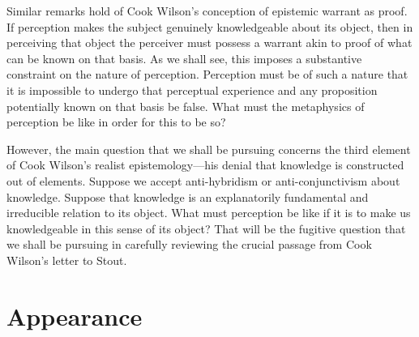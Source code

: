 \documentclass[12pt]{article}
\begin{document}
Similar remarks hold of Cook Wilson's conception of epistemic warrant as proof. If perception makes the subject genuinely knowledgeable about its object, then in perceiving that object the perceiver must possess a warrant akin to proof of what can be known on that basis. As we shall see, this imposes a substantive constraint on the nature of perception. Perception must be of such a nature that it is impossible to undergo that perceptual experience and any proposition potentially known on that basis be false. What must the metaphysics of perception be like in order for this to be so?

However, the main question that we shall be pursuing concerns the third element of Cook Wilson's realist epistemology---his denial that knowledge is constructed out of elements. Suppose we accept anti-hybridism or anti-conjunctivism about knowledge. Suppose that knowledge is an explanatorily fundamental and irreducible relation to its object. What must perception be like if it is to make us knowledgeable in this sense of its object? That will be the fugitive question that we shall be pursuing in carefully reviewing the crucial passage from Cook Wilson's letter to Stout.



\section{Appearance} %
\label{sec:appearance}
\end{document}
